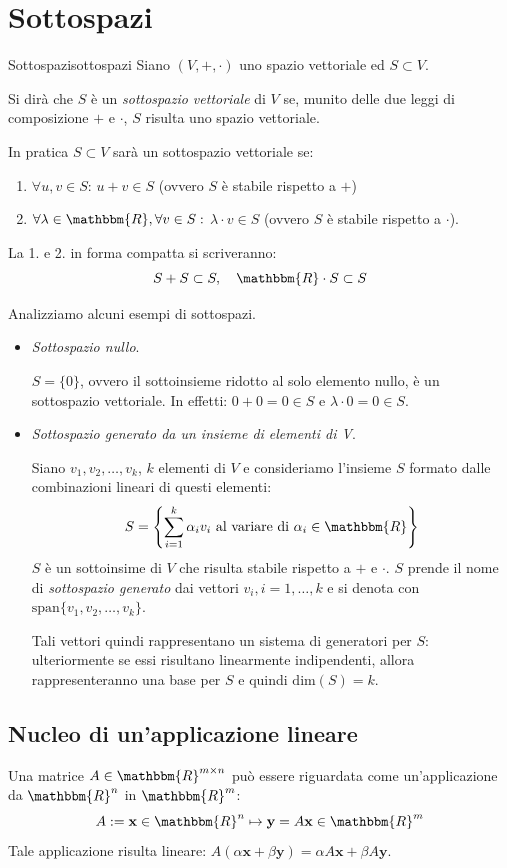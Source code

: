 \documentclass[12pt]{report}
\newcounter{definition}
\newcommand{\nmu}{}
\begin{document}
\section{Sottospazi}
\begin{definition}{\nmu Sottospazi}{sottospazi}
	Siano $(V, +, \cdot)$ uno spazio vettoriale ed $S \subset V$.

	Si dirà che $S$ è un \textit{sottospazio vettoriale} di $V$ se, munito delle due leggi di composizione $+$ e $\cdot$, $S$ risulta uno spazio vettoriale.
\end{definition}
\begin{note}{}{}
In pratica $S \subset V$ sarà un sottospazio vettoriale se:
\begin{enumerate}
	\item $\forall u, v \in S$: $u + v \in S$ (ovvero $S$ è stabile rispetto a $+$)
	\item $\forall \lambda \in \mathbbm{R}, \forall v \in S:$ $\lambda \cdot v \in S$ (ovvero  $S$ è stabile rispetto a $\cdot$).
\end{enumerate}
La 1. e 2. in forma compatta si scriveranno:
\[
S+S \subset S, \quad \mathbbm{R} \cdot S \subset S
\]
\end{note}
Analizziamo alcuni esempi di sottospazi.
\begin{itemize}
	\item \textit{Sottospazio nullo}.

	$S = \{0\}$, ovvero il sottoinsieme ridotto al solo elemento nullo, è un sottospazio vettoriale. In effetti: $0 + 0 = 0 \in S$ e $\lambda \cdot 0 = 0 \in S$.
	\item \textit{Sottospazio generato da un insieme di elementi di V}.

	Siano $v_1, v_2, \dots, v_k$, $k$ elementi di $V$ e consideriamo l'insieme $S$ formato dalle combinazioni lineari di questi elementi:
	\[
	S = \left\{\displaystyle\sum_{i=1}^{k}\alpha_i v_i \text{ al variare di }\alpha_i \in \mathbbm{R}\right\}
	\]
	$S$ è un sottoinsime di $V$ che risulta stabile rispetto a $+$ e $\cdot$. $S$ prende il nome di \textit{sottospazio generato} dai vettori $v_i, i = 1, \dots, k$ e si denota con $\text{span}\{v_1, v_2, \dots, v_k\}$.

	Tali vettori quindi rappresentano un sistema di generatori per $S$: ulteriormente se essi risultano linearmente indipendenti, allora rappresenteranno una base per $S$ e quindi $\text{dim}(S) = k$.
\end{itemize}
\subsection{Nucleo di un'applicazione lineare}
Una matrice $A \in \mathbbm{R}^{m\times n}$ può essere riguardata come un'applicazione da $\mathbbm{R}^n$ in $\mathbbm{R}^m$:
\[
A := \mathbf{x} \in \mathbbm{R}^n \mapsto \mathbf{y} = A\mathbf{x} \in \mathbbm{R}^m
\]
Tale applicazione risulta lineare: $A(\alpha\mathbf{x} + \beta\mathbf{y}) = \alpha A\mathbf{x} + \beta A\mathbf{y}$.
\end{document}

